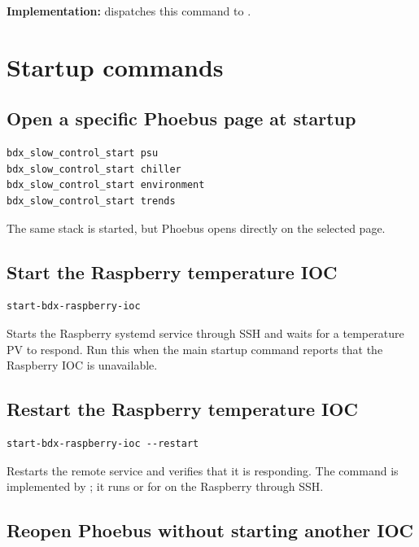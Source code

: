 \documentclass[11pt]{article}
\begin{document}
\textbf{Implementation:}  dispatches this command to .

\clearpage
\section{Startup commands}

\subsection{Open a specific Phoebus page at startup}

\begin{lstlisting}[style=shell]
bdx_slow_control_start psu
bdx_slow_control_start chiller
bdx_slow_control_start environment
bdx_slow_control_start trends
\end{lstlisting}

The same stack is started, but Phoebus opens directly on the selected page.

\subsection{Start the Raspberry temperature IOC}

\begin{lstlisting}[style=shell]
start-bdx-raspberry-ioc
\end{lstlisting}

Starts the Raspberry systemd service through SSH and waits for a temperature PV to respond. Run this when the main startup command reports that the Raspberry IOC is unavailable.

\subsection{Restart the Raspberry temperature IOC}

\begin{lstlisting}[style=shell]
start-bdx-raspberry-ioc --restart
\end{lstlisting}

Restarts the remote service and verifies that it is responding. The command is implemented by ; it runs  or  for  on the Raspberry through SSH.

\subsection{Reopen Phoebus without starting another IOC}
\end{document}

